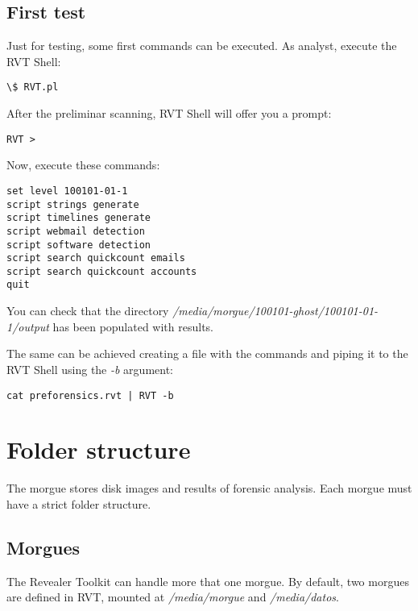 \documentclass[a4paper,11pt,oneside]{report}
\begin{document}
\section{First test}

Just for testing, some first commands can be executed. As analyst, execute the RVT Shell:

\begin{verbatim}
\$ RVT.pl 
\end{verbatim}

After the preliminar scanning, RVT Shell will offer you a prompt:

\begin{verbatim}
RVT >
\end{verbatim}

Now, execute these commands:

\begin{verbatim}
set level 100101-01-1
script strings generate
script timelines generate
script webmail detection
script software detection
script search quickcount emails
script search quickcount accounts
quit
\end{verbatim}

You can check that the directory \emph{/media/morgue/100101-ghost/100101-01-1/output} has been populated with results.

The same can be achieved creating a file with the commands and piping it to the RVT Shell using the \emph{-b} argument:

\begin{verbatim}
cat preforensics.rvt | RVT -b
\end{verbatim}







\chapter{Folder structure}

The morgue stores disk images and results of forensic analysis. Each morgue must have a strict folder structure. 

\section{Morgues}

The Revealer Toolkit can handle more that one morgue. By default, two morgues are defined in RVT, mounted at \emph{/media/morgue} and \emph{/media/datos}. 
\end{document}
